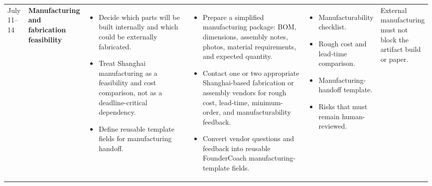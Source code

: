 \documentclass{article}
\begin{document}
\begin{landscape}
\begin{longtable}{
    L{0.05\linewidth}
    L{0.08\linewidth}
    L{0.3\linewidth}
    L{0.33\linewidth}
    L{0.15\linewidth}
    L{0.08\linewidth}
}
July 11--14
&
\textbf{Manufacturing and fabrication feasibility}
&
\begin{itemize}[leftmargin=*,nosep]
    \item Decide which parts will be built internally and which could
    be externally fabricated.
    \item Treat Shanghai manufacturing as a feasibility and cost
    comparison, not as a deadline-critical dependency.
    \item Define reusable template fields for manufacturing handoff.
\end{itemize}
&
\begin{itemize}[leftmargin=*,nosep]
    \item Prepare a simplified manufacturing package:
    BOM, dimensions, assembly notes, photos, material requirements,
    and expected quantity.
    \item Contact one or two appropriate Shanghai-based fabrication
    or assembly vendors for rough cost, lead-time, minimum-order,
    and manufacturability feedback.
    \item Convert vendor questions and feedback into reusable
    FounderCoach manufacturing-template fields.
\end{itemize}
&
\begin{itemize}[leftmargin=*,nosep]
    \item Manufacturability checklist.
    \item Rough cost and lead-time comparison.
    \item Manufacturing-handoff template.
    \item Risks that must remain human-reviewed.
\end{itemize}
&
External manufacturing must not block the artifact build or paper.
\\


\end{longtable}
\end{landscape}
\end{document}

